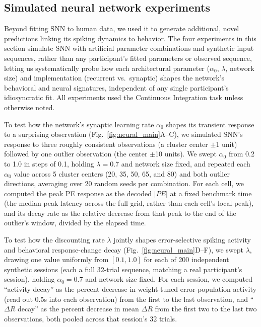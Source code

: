 \documentclass[12pt]{article}
\begin{document}
\subsection{Simulated neural network experiments}
Beyond fitting SNN to human data, we used it to generate additional, novel predictions linking its spiking dynamics to behavior. The four experiments in this section simulate SNN with artificial parameter combinations and synthetic input sequences, rather than any participant's fitted parameters or observed sequence, letting us systematically probe how each architectural parameter ($\alpha_0$, $\lambda$, network size) and implementation (recurrent vs.\ synaptic) shapes the network's behavioral and neural signatures, independent of any single participant's idiosyncratic fit. All experiments used the Continuous Integration task unless otherwise noted.

To test how the network's synaptic learning rate $\alpha_0$ shapes its transient response to a surprising observation (Fig.~\ref{fig:neural_main}A--C), we simulated SNN's response to three roughly consistent observations (a cluster center $\pm$1 unit) followed by one outlier observation (the center $\pm$10 units). We swept $\alpha_0$ from 0.2 to 1.0 in steps of 0.1, holding $\lambda=0.7$ and network size fixed, and repeated each $\alpha_0$ value across 5 cluster centers (20, 35, 50, 65, and 80) and both outlier directions, averaging over 20 random seeds per combination. For each cell, we computed the peak PE response as the decoded $|PE|$ at a fixed benchmark time (the median peak latency across the full grid, rather than each cell's local peak), and its decay rate as the relative decrease from that peak to the end of the outlier's window, divided by the elapsed time.

To test how the discounting rate $\lambda$ jointly shapes error-selective spiking activity and behavioral response-change decay (Fig.~\ref{fig:neural_main}D--F), we swept $\lambda$, drawing one value uniformly from $[0.1, 1.0]$ for each of 200 independent synthetic sessions (each a full 32-trial sequence, matching a real participant's session), holding $\alpha_0=0.7$ and network size fixed. For each session, we computed ``activity decay'' as the percent decrease in weight-tuned error-population activity (read out 0.5s into each observation) from the first to the last observation, and ``$\Delta R$ decay'' as the percent decrease in mean $\Delta R$ from the first two to the last two observations, both pooled across that session's 32 trials.
\end{document}
